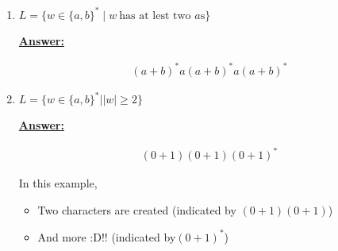 \documentclass[12pt]{article}
\begin{document}
\begin{enumerate}[a.]
\begin{itemize}
\begin{enumerate}[1.]
            \item $L = \{w \in \{a,b\}^* \mid w\:\text{has at lest two $a$s}\}$

            \bigskip

            \begin{mdframed}
                \underline{\textbf{Answer:}}

                \begin{align}
                (a+b)^*a(a+b)^*a(a+b)^*
                \end{align}
            \end{mdframed}

            \item $L = \{w \in \{a,b\}^* \mid \vert w \vert \geq 2\}$

            \bigskip

            \begin{mdframed}
                \underline{\textbf{Answer:}}

                \begin{align}
                (0+1)(0+1)(0+1)^*
                \end{align}

                \bigskip

                In this example,

                \bigskip

                \begin{itemize}
                    \item Two characters are created (indicated by $(0+1)(0+1)$)
                    \item And more :D!! (indicated by$(0+1)^*$)
                \end{itemize}
            \end{mdframed}
        \end{enumerate}
    \end{itemize}
\end{enumerate}
\end{document}
